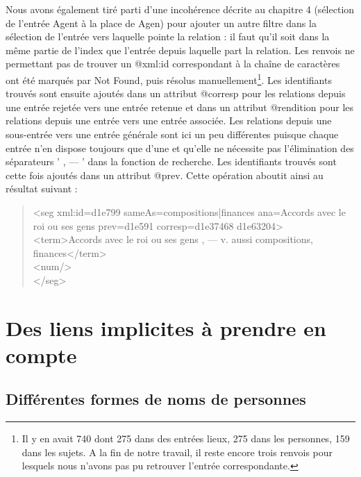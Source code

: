 \documentclass[a4paper,12pt,twoside]{book}
\begin{document}
	Nous avons également tiré parti d'une incohérence décrite au chapitre 4 (sélection de l'entrée \og Agent\fg{} à la place de \og Agen\fg{}) pour ajouter un autre filtre dans la sélection de l'entrée vers laquelle pointe la relation : il faut qu'il soit dans la même partie de l'index que l'entrée depuis laquelle part la relation. Les renvois ne permettant pas de trouver un @xml:id correspondant à la chaîne de caractères ont été marqués par \og Not Found\fg{}, puis résolus manuellement\footnote{Il y en avait 740 dont 275 dans des entrées lieux, 275 dans les personnes, 159 dans les sujets. A la fin de notre travail, il reste encore trois renvois pour lesquels nous n'avons pas pu retrouver l'entrée correspondante.}. Les identifiants trouvés sont ensuite ajoutés dans un attribut @corresp pour les relations depuis une entrée rejetée vers une entrée retenue et dans un attribut @rendition pour les relations depuis une entrée vers une entrée associée. Les relations depuis une sous-entrée vers une entrée générale sont ici un peu différentes puisque chaque entrée n'en dispose toujours que d'une et qu'elle ne nécessite pas l'élimination des séparateurs ' , — ' dans la fonction de recherche. Les identifiants trouvés sont cette fois ajoutés dans un attribut @prev. Cette opération aboutit ainsi au résultat suivant :
	
	\begin{quotation}
               <seg xml:id=\textquotesingle d1e799\textquotesingle{} sameAs=\textquotesingle compositions|finances\textquotesingle{} ana=\textquotesingle Accords avec le roi ou ses gens\textquotesingle{} prev=\textquotesingle d1e591\textquotesingle{} corresp=\textquotesingle d1e37468 d1e63204\textquotesingle >\\
				\indent\indent<term>Accords avec le roi ou ses gens , — v. aussi compositions, finances</term>\\
				\indent\indent<num/>\\
				\indent</seg>
	\end{quotation}

	\section{Des liens implicites à prendre en compte}
	
	\subsection{Différentes formes de noms de personnes}
	
\end{document}
